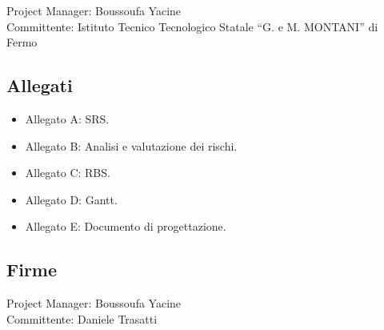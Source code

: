 \documentclass{article}
\begin{document}
\begin{flushleft}
		Project Manager: Boussoufa Yacine\\
		
		Committente: Istituto Tecnico Tecnologico Statale “G. e M. MONTANI” di Fermo\\
		
		\vspace{2mm}
		
		\subsection{Allegati}
		
		\begin{itemize}
			
			\item Allegato A: SRS.
			
			\item Allegato B: Analisi e valutazione dei rischi.
			
			\item Allegato C: RBS.
			
			\item Allegato D: Gantt.
			
			\item Allegato E: Documento di progettazione.
			
		\end{itemize}
		
		\subsection{Firme}
		
		Project Manager: Boussoufa Yacine\\
		
		Committente: Daniele Trasatti
		
		
		
	\end{flushleft}
	
	
	
	
	
	
	
\end{document}
